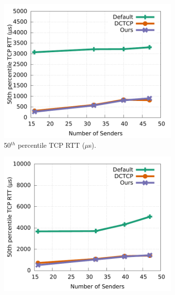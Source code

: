 \iffalse
\begin{figure}[t]
        \centering
        \begin{subfigure}[b]{0.33\textwidth}
                \centering
                \includegraphics[width=\textwidth]{figures/incast/plots15k/15k_incast_sockperf50th_vary_sender.pdf}
                \caption{50$^{th}$ percentile TCP RTT ($\mu$s).}
                \label{incast_15k_50th_sockperf}
        \end{subfigure}
        \begin{subfigure}[b]{0.33\textwidth}
                \centering
                \includegraphics[width=\textwidth]{figures/incast/plots15k/15k_incast_sockperf999th_vary_sender.pdf}

\end{subfigure}
\end{figure}
